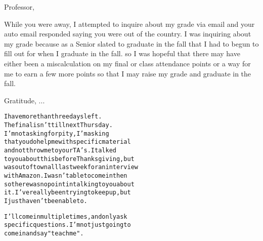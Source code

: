 \documentclass{beamer}
\begin{document}
\begin{frame}[fragile]

Professor,

While you were away, I attempted to inquire about my grade via email and your auto email responded saying you were out of the country. I was inquiring about my grade because as a Senior slated to graduate in the fall {\color{blue}{I was hoping to earn an A- in your class after we had taken the final. I needed the A- for gpa purposes for job applications}} that I had to begun to fill out for when I graduate in the fall. {\color{brown}{I work in Dr. Kazic's Lab and she always speaks highly of you}} so I was hopeful that there may have either been a miscalculation on my final or class attendance points or a way for me to earn a few more points so that I may raise my grade and graduate in the fall.

{\color{red}{Is there any way for me to raise my grade a degree?}}

Gratitude,
    ...
\end{frame}

\begin{frame}[fragile]

{\small
\begin{alltt}
I have more than three days left.  
The final isn't till next Thursday. 
I'm not asking for pity, I'm asking 
that you do help me with specific material 
and not throw me to your TA's.  I talked 
to you about this before Thanksgiving, but 
was out of town all last week for an interview 
with Amazon.  I wasn't able to come in then 
so there was no point in talking to you about 
it.  I've really been trying to keep up, but 
I just haven't been able to.  

I'll come in multiple times, and only ask 
specific questions.  I'm not just going to 
come in and say "teach me".  
\end{alltt}}

\end{frame}
\end{document}
